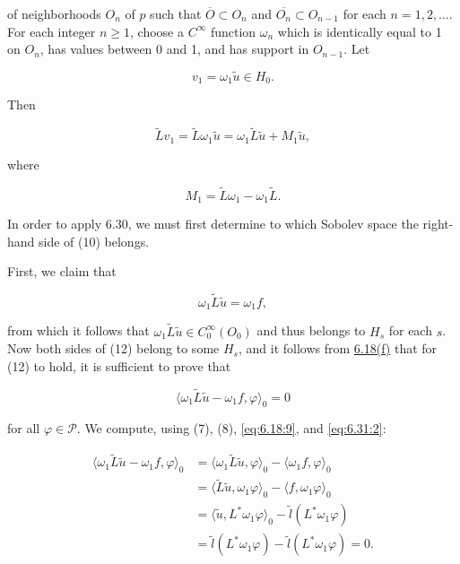 of neighborhoods $O_n$ of $p$ such that $\overline{O} \subset O_n$ and $\overline{O_n} \subset O_{n-1}$ for each $n=1,2,\ldots$. For each integer $n\geq1$, choose a $C^\infty$ function $\omega_n$ which is identically equal to 1 on $O_n$, has values between 0 and 1, and has support in $O_{n-1}$. Let


\begin{equation}
\tag{9}\label{eq:6.32:9}
v_{1}=\omega_{1}\tilde{u}\in H_{0}.
\end{equation}

Then

\begin{equation}
\tag{10}\label{eq:6.32:10}
\tilde{L}v_{1}=\tilde{L}\omega_{1}\tilde{u}=\omega_{1}\tilde{L}\tilde{u}+M_{1}\tilde{u},
\end{equation}

where

\begin{equation}
\tag{11}\label{eq:6.32:11}
M_{1}=\tilde{L}\omega_{1}-\omega_{1}\tilde{L}.
\end{equation}

In order to apply 6.30, we must first determine to which Sobolev space the right-hand side of (10) belongs.

First, we claim that


\begin{equation}
\tag{12}\label{eq:6.32:12}
\omega_{1}\tilde{L}\tilde{u}=\omega_{1}f,
\end{equation}

from which it follows that  $ \omega_1\tilde{L}\tilde{u} \in C_0^\infty(O_0) $ and thus belongs to  $ H_s $ for each  $ s $. Now both sides of (12) belong to some  $ H_s $, and it follows from \hyperref[thm:6.18]{6.18(f)} that for (12) to hold, it is sufficient to prove that

\begin{equation}
\tag{13}\label{eq:6.32:13}
\langle\omega_{1}\tilde{L}\tilde{u}-\omega_{1}f,\varphi\rangle_{0}=0
\end{equation}

for all  $ \varphi \in \mathcal{P} $. We compute, using (7), (8), \eqref{eq:6.18:9}, and \eqref{eq:6.31:2}:

\[
\begin{aligned}{\langle\omega_{1}\tilde{L}\tilde{u}-\omega_{1}f,\varphi\rangle_{0}}&{{}=\langle\omega_{1}\tilde{L}\tilde{u},\varphi\rangle_{0}-\langle\omega_{1}f,\varphi\rangle_{0}}\\ {}&{{}=\langle\tilde{L}\tilde{u},\omega_{1}\varphi\rangle_{0}-\langle f,\omega_{1}\varphi\rangle_{0}}\\ {}&{{}=\langle\tilde{u},L^{*}\omega_{1}\varphi\rangle_{0}-\tilde{l}(L^{*}\omega_{1}\varphi)}\\ {}&{{}=\tilde{l}(L^{*}\omega_{1}\varphi)-\tilde{l}(L^{*}\omega_{1}\varphi)=0.}\\ \end{aligned}
\]

